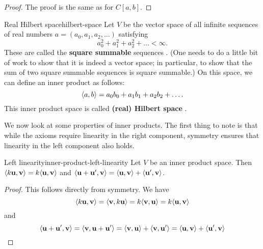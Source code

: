 \begin{proof}
  The proof is the same as for $C[a,b]$. 
\end{proof}

\begin{example}{Real Hilbert space}{hilbert-space}
  Let $V$ be the vector space of all infinite sequences of real
  numbers $a=(a_0,a_1,a_2,\ldots)$ satisfying
  \begin{equation*}
    a_0^2 + a_1^2 + a_2^2 + \ldots < \infty.
  \end{equation*}
  These are called the \textbf{square summable} sequences%
  . (One needs
  to do a little bit of work to show that it is indeed a vector space;
  in particular, to show that the sum of two square summable sequences
  is square summable.) On this space, we can
  define an inner product as follows:
  \begin{equation*}
    \langle a,b\rangle = a_0b_0 + a_1b_1 + a_2b_2 + \ldots.
  \end{equation*}
  This inner product space is called \textbf{(real) Hilbert space}%
  .
\end{example}

We now look at some properties of inner products. The first thing to
note is that while the axioms require linearity in the right
component, symmetry ensures that linearity in the left component also
holds.

\begin{proposition}{Left linearity}{inner-product-left-linearity}
  Let $V$ be an inner product space. Then
  $\iprod{k\vect{u},\vect{v}} = k\iprod{\vect{u},\vect{v}}$ and
  $\iprod{\vect{u}+\vect{u}',\vect{v}} = \iprod{\vect{u},\vect{v}} +
  \iprod{\vect{u}',\vect{v}}$.
\end{proposition}

\begin{proof}
  This follows directly from symmetry. We have
  \begin{equation*}
    \iprod{k\vect{u},\vect{v}}
    = \iprod{\vect{v},k\vect{u}}
    = k\iprod{\vect{v},\vect{u}}
    = k\iprod{\vect{u},\vect{v}}
  \end{equation*}
  and
  \begin{equation*}
    \iprod{\vect{u}+\vect{u}',\vect{v}}
    = \iprod{\vect{v},\vect{u}+\vect{u}'}
    = \iprod{\vect{v},\vect{u}} + \iprod{\vect{v},\vect{u}'}
    = \iprod{\vect{u},\vect{v}} + \iprod{\vect{u}',\vect{v}}
  \end{equation*}
\end{proof}

